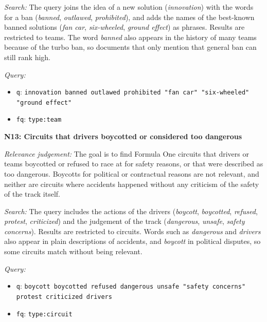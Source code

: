 \documentclass[sigconf]{acmart}
\newcommand{\needheading}[1]{\par\medskip\noindent\textbf{#1}\par\nopagebreak\smallskip}
\begin{document}
\textit{Search:} The query joins the idea of a new solution (\textit{innovation}) with the
words for a ban (\textit{banned}, \textit{outlawed}, \textit{prohibited}),
and adds the names of the best-known banned solutions (\textit{fan car},
\textit{six-wheeled}, \textit{ground effect}) as phrases. Results are
restricted to teams. The word \textit{banned} also appears in the history of
many teams because of the turbo ban, so documents that only mention that
general ban can still rank high.

\textit{Query:}
\begin{itemize}
  \item \texttt{q}: \texttt{innovation banned outlawed prohibited "fan car" "six-wheeled" "ground effect"}
  \item \texttt{fq}: \texttt{type:team}
\end{itemize}

\needheading{N13: Circuits that drivers boycotted or considered too dangerous}
\textit{Relevance judgement:} The goal is to find Formula One circuits that drivers or teams boycotted
or refused to race at for safety reasons, or that were described as too
dangerous. Boycotts for political or contractual reasons are not relevant,
and neither are circuits where accidents happened without any criticism of
the safety of the track itself.

\textit{Search:} The query includes the actions of the drivers (\textit{boycott},
\textit{boycotted}, \textit{refused}, \textit{protest}, \textit{criticized})
and the judgement of the track (\textit{dangerous}, \textit{unsafe},
\textit{safety concerns}). Results are restricted to circuits. Words such as
\textit{dangerous} and \textit{drivers} also appear in plain descriptions of
accidents, and \textit{boycott} in political disputes, so some circuits match
without being relevant.

\textit{Query:}
\begin{itemize}
  \item \texttt{q}: \texttt{boycott boycotted refused dangerous unsafe "safety concerns" protest criticized drivers}
  \item \texttt{fq}: \texttt{type:circuit}
\end{itemize}

\end{document}
